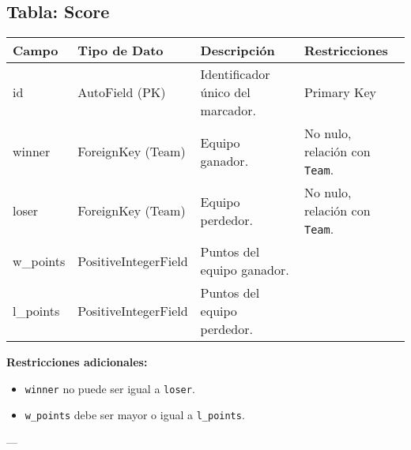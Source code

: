 \documentclass{report}
\begin{document}
    \subsection*{Tabla: Score}
    \begin{tabular}{|>{\raggedright\arraybackslash}p{3cm}|>{\raggedright\arraybackslash}p{3cm}|>{\raggedright\arraybackslash}p{6cm}|>{\raggedright\arraybackslash}p{4cm}|}
        \hline
        \textbf{Campo} & \textbf{Tipo de Dato} & \textbf{Descripción} & \textbf{Restricciones} \\
        \hline
        id & AutoField (PK) & Identificador único del marcador. & Primary Key \\
        \hline
        winner & ForeignKey (Team) & Equipo ganador. & No nulo, relación con \texttt{Team}. \\
        \hline
        loser & ForeignKey (Team) & Equipo perdedor. & No nulo, relación con \texttt{Team}. \\
        \hline
        w\_points & PositiveIntegerField & Puntos del equipo ganador. &  \\
        \hline
        l\_points & PositiveIntegerField & Puntos del equipo perdedor. &  \\
        \hline
    \end{tabular}
    
    \textbf{Restricciones adicionales:}
    \begin{itemize}
        \item \texttt{winner} no puede ser igual a \texttt{loser}.
        \item \texttt{w\_points} debe ser mayor o igual a \texttt{l\_points}.
    \end{itemize}
    
    ---
    
\end{document}

